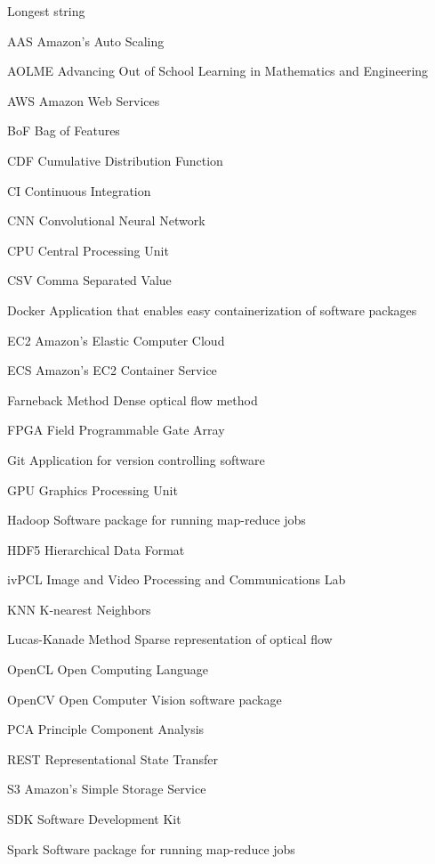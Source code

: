 \documentclass[botnum, fleqn, final]{unmeethesis}
\begin{document}
  \tableofcontents
  \listoffigures
  \listoftables

  \begin{glossary}{Longest  string}
    \item[AAS] Amazon's Auto Scaling
    \item[AOLME] Advancing Out of School Learning in Mathematics and Engineering
    \item[AWS] Amazon Web Services
    \item[BoF] Bag of Features
    \item[CDF] Cumulative Distribution Function
    \item[CI] Continuous Integration
    \item[CNN] Convolutional Neural Network
    \item[CPU] Central Processing Unit
    \item[CSV] Comma Separated Value
    \item[Docker] Application that enables easy containerization of software packages
    \item[EC2] Amazon's Elastic Computer Cloud
    \item[ECS] Amazon's EC2 Container Service
    \item[Farneback Method] Dense optical flow method
    \item[FPGA] Field Programmable Gate Array
    \item[Git] Application for version controlling software
    \item[GPU] Graphics Processing Unit
    \item[Hadoop] Software package for running map-reduce jobs
    \item[HDF5] Hierarchical Data Format
    \item[ivPCL] Image and Video Processing and Communications Lab
    \item[KNN] K-nearest Neighbors
    \item[Lucas-Kanade Method] Sparse representation of optical flow
    \item[OpenCL] Open Computing Language
    \item[OpenCV] Open Computer Vision software package
    \item[PCA] Principle Component Analysis
    \item[REST] Representational State Transfer
    \item[S3]  Amazon's Simple Storage Service
    \item[SDK] Software Development Kit
    \item[Spark] Software package for running map-reduce jobs

\end{glossary}
\end{document}

